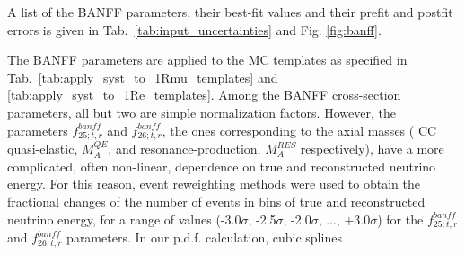 \begin{enumerate}


A list of the BANFF parameters, their best-fit values and their prefit and postfit errors is given in Tab.\ \ref{tab:input_uncertainties} and Fig. \ref{fig:banff}.

The BANFF parameters are applied to the MC templates as specified in Tab.\ \ref{tab:apply_syst_to_1Rmu_templates} and \ref{tab:apply_syst_to_1Re_templates}.
Among the BANFF cross-section parameters, all but two are simple normalization factors. 
However, the parameters $f_{25; t, r}^{banff}$ and $f_{26; t, r}^{banff}$, the ones corresponding to the 
axial masses ( CC quasi-elastic, $M_{A}^{QE}$, and resonance-production, $M_{A}^{RES}$ respectively), have a more complicated, often non-linear, dependence on true and reconstructed neutrino energy.
For this reason, event reweighting methods were used to obtain the fractional changes of the number of events
in bins of true and reconstructed neutrino energy, for a range of values (-3.0$\sigma$, -2.5$\sigma$, -2.0$\sigma$, ..., +3.0$\sigma$) for the $f_{25; t, r}^{banff}$ and $f_{26; t, r}^{banff}$ parameters.
In our p.d.f. calculation, cubic splines


\end{enumerate}
